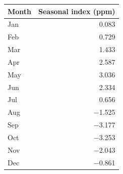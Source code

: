 \begin{tabular}{lr}
\toprule
Month & Seasonal index (ppm)\\
\midrule
Jan & 0.083\\
Feb & 0.729\\
Mar & 1.433\\
Apr & 2.587\\
May & 3.036\\
Jun & 2.334\\
Jul & 0.656\\
Aug & $-$1.525\\
Sep & $-$3.177\\
Oct & $-$3.253\\
Nov & $-$2.043\\
Dec & $-$0.861\\
\bottomrule
\end{tabular}
